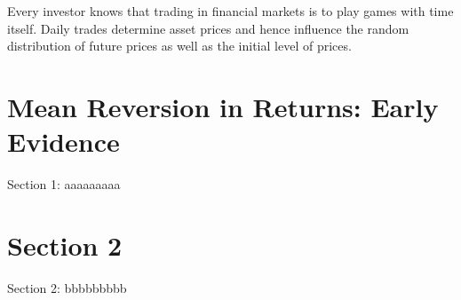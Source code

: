 \minitoc

\vspace{0.5cm}
Every investor knows that trading in financial markets is to play
games with time itself. Daily trades determine asset prices and hence
influence the random distribution of future prices as well as the initial
level of prices.

\section{Mean Reversion in Returns: Early Evidence}
Section 1: aaaaaaaaa

\section{Section 2}
Section 2: bbbbbbbbb